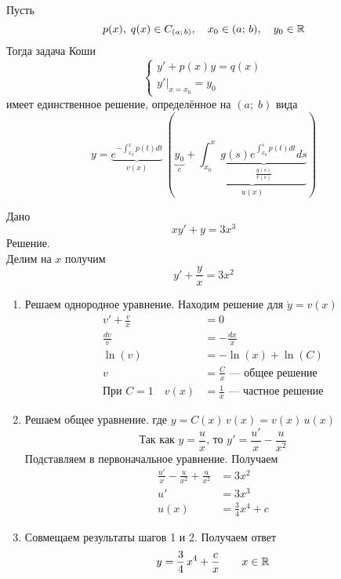 \begin{Note}
    Пусть 
    \[
        p(x),\; q(x)\in C_{(a;\,b)}, \quad x_0 \in (a;\,b), \quad y_0 \in \mathbb{R}
    \]
    Тогда задача Коши\\
    \[
        \begin{cases}
            y'+p(x)y=q(x) \\
            y'|_{x=x_0}=y_0
        \end{cases}
    \]
    имеет единственное решение, определённое на $(a;\;b)$ вида\\
    \[
        y=\underbrace{e^{-\int_{x_0}^{x} p(t)dt}}_{v(x)}\,\left(\underbrace{y_0}_{c}+\underbrace{\int_{x_0}^{x}\underbrace{g(s)e^{\int_{x_0}^{s} p(t)dt}ds}_{\frac{g(s)}{v(s)}}}_{u(x)}\right)
    \]
\end{Note}

\begin{Example}
    Дано
    \[
        xy'+y=3x^3
    \]
    Решение.\\
    Делим на $x$ получим
    \[
        y'+\frac{y}{x}=3x^2
    \]
    \begin{enumerate}
        \item Решаем однородное уравнение. Находим решение для $\mathring{y} = v(x)$
        \begin{align*}
            v'+\frac{v}{x}&=0\\
            \frac{dv}{v}&=-\frac{dx}{x}\\
            \ln(v)&=-\ln(x)+\ln(C)\\
            v&=\frac{C}{x} \text{ --- общее решение}\\
            \text{При } C=1 \quad v(x)&=\frac{1}{x} \text{ --- частное решение}
        \end{align*}
        
        \item Решаем общее уравнение. где $y = C(x)\,v(x) = v(x)\,u(x)$ 
        \[
            \text{Так как } y=\frac{u}{x} \text{, то } y'=\frac{u'}{x} - \frac{u}{x^2}
        \]
        Подставляем в первоначальное уравнение. Получаем
        \begin{align*}
            \frac{u'}{x} - \frac{u}{x^2}+\frac{u}{x^2}&=3x^2\\
            u'&=3x^3\\
            u(x)&=\frac{3}{4}x^4+c
        \end{align*}

        \item Совмещаем результаты шагов 1 и 2. Получаем ответ
        \[
            y=\frac{3}{4}\,x^4+\frac{c}{x} \qquad x\in \mathbb{R}
        \]
    \end{enumerate}
\end{Example}


